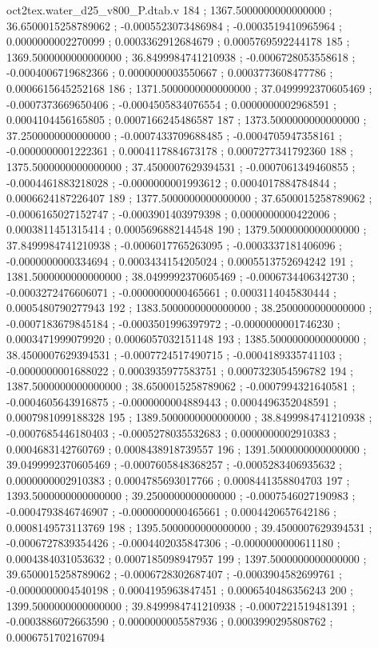 \begin{filecontents}[overwrite]{oct2tex.water_d25_v800_P.dtab.v}
184 ; 1367.5000000000000000 ; 36.6500015258789062 ; -0.0005523073486984 ; -0.0003519410965964 ; 0.0000000002270099 ; 0.0003362912684679 ; 0.0005769592244178
185 ; 1369.5000000000000000 ; 36.8499984741210938 ; -0.0006728053558618 ; -0.0004006719682366 ; 0.0000000003550667 ; 0.0003773608477786 ; 0.0006615645252168
186 ; 1371.5000000000000000 ; 37.0499992370605469 ; -0.0007373669650406 ; -0.0004505834076554 ; 0.0000000002968591 ; 0.0004104456165805 ; 0.0007166245486587
187 ; 1373.5000000000000000 ; 37.2500000000000000 ; -0.0007433709688485 ; -0.0004705947358161 ; -0.0000000001222361 ; 0.0004117884673178 ; 0.0007277341792360
188 ; 1375.5000000000000000 ; 37.4500007629394531 ; -0.0007061349460855 ; -0.0004461883218028 ; -0.0000000001993612 ; 0.0004017884784844 ; 0.0006624187226407
189 ; 1377.5000000000000000 ; 37.6500015258789062 ; -0.0006165027152747 ; -0.0003901403979398 ; 0.0000000000422006 ; 0.0003811451315414 ; 0.0005696882144548
190 ; 1379.5000000000000000 ; 37.8499984741210938 ; -0.0006017765263095 ; -0.0003337181406096 ; -0.0000000000334694 ; 0.0003434154205024 ; 0.0005513752694242
191 ; 1381.5000000000000000 ; 38.0499992370605469 ; -0.0006734406342730 ; -0.0003272476606071 ; -0.0000000000465661 ; 0.0003114045830444 ; 0.0005480790277943
192 ; 1383.5000000000000000 ; 38.2500000000000000 ; -0.0007183679845184 ; -0.0003501996397972 ; -0.0000000001746230 ; 0.0003471999079920 ; 0.0006057032151148
193 ; 1385.5000000000000000 ; 38.4500007629394531 ; -0.0007724517490715 ; -0.0004189335741103 ; -0.0000000001688022 ; 0.0003935977583751 ; 0.0007323054596782
194 ; 1387.5000000000000000 ; 38.6500015258789062 ; -0.0007994321640581 ; -0.0004605643916875 ; -0.0000000004889443 ; 0.0004496352048591 ; 0.0007981099188328
195 ; 1389.5000000000000000 ; 38.8499984741210938 ; -0.0007685446180403 ; -0.0005278035532683 ; 0.0000000002910383 ; 0.0004683142760769 ; 0.0008438918739557
196 ; 1391.5000000000000000 ; 39.0499992370605469 ; -0.0007605848368257 ; -0.0005283406935632 ; 0.0000000002910383 ; 0.0004785693017766 ; 0.0008441358804703
197 ; 1393.5000000000000000 ; 39.2500000000000000 ; -0.0007546027190983 ; -0.0004793846746907 ; -0.0000000000465661 ; 0.0004420657642186 ; 0.0008149573113769
198 ; 1395.5000000000000000 ; 39.4500007629394531 ; -0.0006727839354426 ; -0.0004402035847306 ; -0.0000000000611180 ; 0.0004384031053632 ; 0.0007185098947957
199 ; 1397.5000000000000000 ; 39.6500015258789062 ; -0.0006728302687407 ; -0.0003904582699761 ; -0.0000000004540198 ; 0.0004195963847451 ; 0.0006540486356243
200 ; 1399.5000000000000000 ; 39.8499984741210938 ; -0.0007221519481391 ; -0.0003886072663590 ; 0.0000000005587936 ; 0.0003990295808762 ; 0.0006751702167094

\end{filecontents}
